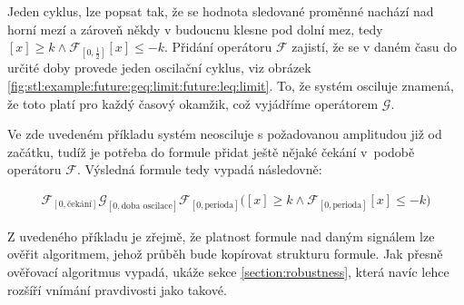 Jeden cyklus, lze popsat tak, že se hodnota sledované proměnné nachází nad horní mezí a zároveň někdy
v budoucnu klesne pod dolní mez, tedy $[x] \geq k \wedge \mathcal{F}_{[0, \frac{1}{2}]}[x] \leq -k$.
Přidání operátoru $\mathcal{F}$ zajistí, že se v daném času do určité doby provede jeden oscilační cyklus,
viz obrázek \ref{fig:stl:example:future:geq:limit:future:leq:limit}. To, že systém
osciluje znamená, že toto platí pro každý časový okamžik, což vyjádříme operátorem $\mathcal{G}$.

Ve zde uvedeném příkladu systém neosciluje s požadovanou amplitudou již od začátku,
tudíž je potřeba do formule přidat ještě nějaké čekání v~podobě operátoru $\mathcal{F}$.
Výsledná formule tedy vypadá následovně:

\begin{align}\label{eq:stl:lotkav:oscil}
\mathcal{F}_{[0, \textrm{čekání}]}\mathcal{G}_{[0, \textrm{doba oscilace}]}\mathcal{F}_{[0, \textrm{perioda}]}\Big([x] \geq k \wedge \mathcal{F}_{[0, \textrm{perioda}]}[x] \leq -k\Big)
\end{align}

Z uvedeného příkladu je zřejmě, že platnost formule nad daným signá\-lem
lze ověřit algoritmem, jehož průběh bude kopírovat strukturu formule. Jak
přesně ověřovací algoritmus vypadá, ukáže sekce \ref{section:robustness},
která navíc lehce rozšíří vnímání pravdivosti jako takové.
